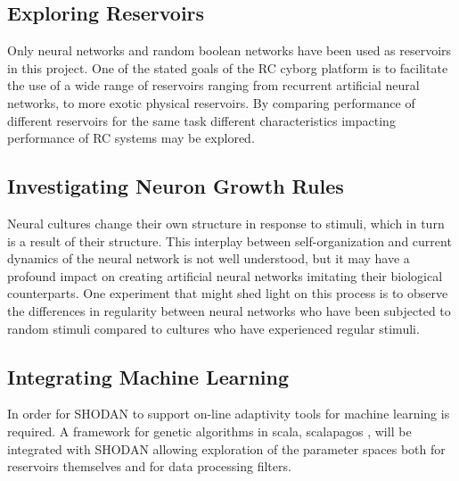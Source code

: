 \subsection{Exploring Reservoirs}
Only neural networks and random boolean networks have been used as reservoirs in
this project. 
One of the stated goals of the RC cyborg platform is to facilitate the use of a
wide range of reservoirs ranging from recurrent artificial neural networks, to
more exotic physical reservoirs.
By comparing performance of different reservoirs for the same task different
characteristics impacting performance of RC systems may be explored.
\subsection{Investigating Neuron Growth Rules}
Neural cultures change their own structure in response to stimuli, which in turn
is a result of their structure.
This interplay between self-organization and current dynamics of the neural
network is not well understood, but it may have a profound impact on creating
artificial neural networks imitating their biological counterparts.
One experiment that might shed light on this process is to observe the
differences in regularity between neural networks who have been subjected to
random stimuli compared to cultures who have experienced regular stimuli.
\subsection{Integrating Machine Learning}
In order for SHODAN to support on-line adaptivity tools for machine learning is
required.
A framework for genetic algorithms in scala, scalapagos \cite{scalapagos}, will
be integrated with SHODAN allowing exploration of the parameter spaces both for
reservoirs themselves and for data processing filters.
